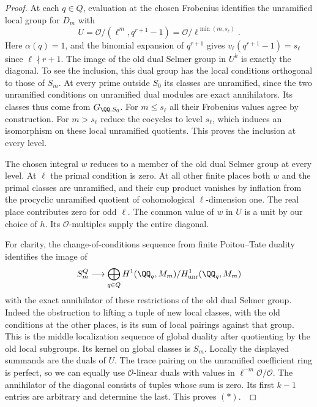 \documentclass[a4paper,11pt]{article}
\theoremstyle{definition}
\theoremstyle{remark}
\numberwithin{equation}{section}
\newcommand{\OO}{\mathcal O}
\begin{document}
\begin{proof}
At each \(q\in Q\), evaluation at the chosen Frobenius identifies the
unramified local group for \(D_m\) with
\[
             U=\OO/(\ell^m,q^{r+1}-1)
               =\OO/\ell^{\min(m,s_\ell)} .
\]
Here \(\alpha(q)=1\), and the binomial expansion of \(q^{r+1}\)
gives \(v_\ell(q^{r+1}-1)=s_\ell\) since \(\ell\nmid r+1\).
The image of the old dual Selmer group in \(U^k\) is exactly
the diagonal. To see the inclusion, this dual group has the local
conditions orthogonal to those of \(S_m\). At every prime outside
\(S_0\) its classes are unramified, since the two unramified
conditions on unramified dual modules are exact annihilators.
Its classes thus come from \(G_{\QQ,S_0}\). For \(m\le s_\ell\)
all their Frobenius values agree by construction. For \(m>s_\ell\)
reduce the cocycles to level \(s_\ell\), which induces an
isomorphism on these local unramified quotients. This proves
the inclusion at every level.

The chosen integral \(w\) reduces to a member of the old dual
Selmer group at every level. At \(\ell\) the primal condition is
zero. At all other finite places both \(w\) and the primal classes
are unramified, and their cup product vanishes by inflation from the
procyclic unramified quotient of cohomological \(\ell\)-dimension
one. The real place contributes zero for odd \(\ell\). The common
value of \(w\) in \(U\) is a unit by our choice of \(h\).
Its \(\OO\)-multiples supply the entire diagonal.

For clarity, the change-of-conditions sequence from finite
Poitou--Tate duality identifies the image of
\[
 S_m^Q\longrightarrow
 \bigoplus_{q\in Q}H^1(\QQ_q,M_m)/H^1_{\rm unr}(\QQ_q,M_m)
\]
with the exact annihilator of these restrictions of the old dual
Selmer group. Indeed the obstruction to lifting a tuple of new
local classes, with the old conditions at the other places, is its
sum of local pairings against that group. This is the middle
localization sequence of global duality after quotienting by the
old local subgroups. Its kernel on global classes is \(S_m\).
Locally the displayed summands are the duals of \(U\). The trace
pairing on the unramified coefficient ring is perfect, so we can
equally use \(\OO\)-linear duals with values in
\(\ell^{-m}\OO/\OO\). The annihilator of the diagonal consists of
tuples whose sum is zero. Its first \(k-1\) entries are arbitrary
and determine the last. This proves \((\ast)\).~\cite{IV-II-II-duality13}
\end{proof}
\end{document}

